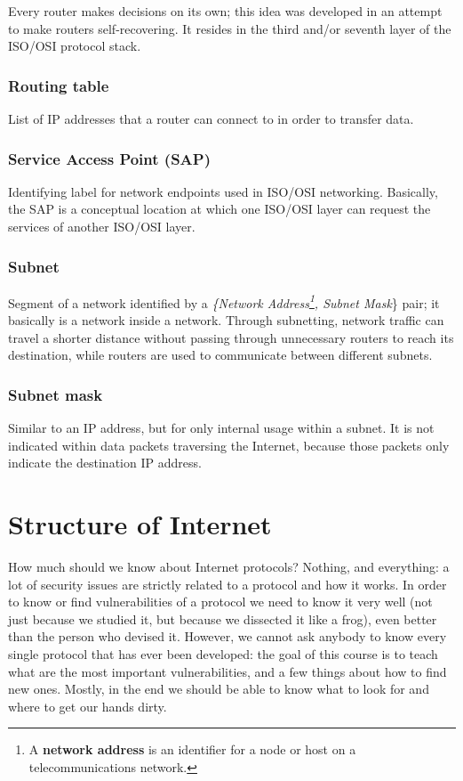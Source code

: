Every router makes decisions on its own; this idea was developed in an attempt to make routers self-recovering. It resides in the third and/or seventh layer of the ISO/OSI protocol stack.


\subsubsection*{Routing table}
List of IP addresses that a router can connect to in order to transfer data.


\subsubsection*{Service Access Point (SAP)}
Identifying label for network endpoints used in ISO/OSI networking. Basically, the SAP is a conceptual location at which one ISO/OSI layer can request the services of another ISO/OSI layer.


\subsubsection*{Subnet}
Segment of a network identified by a \textit{\{Network Address\footnote{A \textbf{network address} is an identifier for a node or host on a telecommunications network.}, Subnet Mask}\} pair; it basically is a network inside a network. Through subnetting, network traffic can travel a shorter distance without passing through unnecessary routers to reach its destination, while routers are used to communicate between different subnets.


\subsubsection*{Subnet mask}
Similar to an IP address, but for only internal usage within a subnet. It is not indicated within data packets traversing the Internet, because those packets only indicate the destination IP address.


\section{Structure of Internet}
How much should we know about Internet protocols? Nothing, and everything: a lot of security issues are strictly related to a protocol and how it works. In order to know or find vulnerabilities of a protocol we need to know it very well (not just because we studied it, but because we dissected it like a frog), even better than the person who devised it. However, we cannot ask anybody to know every single protocol that has ever been developed: the goal of this course is to teach what are the most important vulnerabilities, and a few things about how to find new ones. Mostly, in the end we should be able to know what to look for and where to get our hands dirty.

